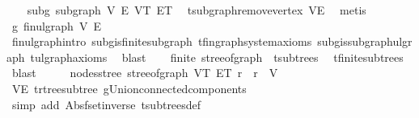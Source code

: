 \begin{isabellebody}
\ \ \isamarkupfalse%
\ subg{\isacharcolon}{\kern0pt}\ subgraph\ V{\isacharprime}{\kern0pt}\ E{\isacharprime}{\kern0pt}\ V\isactrlsub T\ E\isactrlsub T\ \isamarkupfalse%
\ t{\isachardot}{\kern0pt}subgraph{\isacharunderscore}{\kern0pt}remove{\isacharunderscore}{\kern0pt}vertex\ VE{\isacharprime}{\kern0pt}\ \isamarkupfalse%
\ metis\isanewline
\ \ \isamarkupfalse%
\ g{\isacharprime}{\kern0pt}{\isacharcolon}{\kern0pt}\ fin{\isacharunderscore}{\kern0pt}ulgraph\ V{\isacharprime}{\kern0pt}\ E{\isacharprime}{\kern0pt}\ \isamarkupfalse%
\ fin{\isacharunderscore}{\kern0pt}ulgraph{\isachardot}{\kern0pt}intro\ subg{\isachardot}{\kern0pt}is{\isacharunderscore}{\kern0pt}finite{\isacharunderscore}{\kern0pt}subgraph\ t{\isachardot}{\kern0pt}fin{\isacharunderscore}{\kern0pt}graph{\isacharunderscore}{\kern0pt}system{\isacharunderscore}{\kern0pt}axioms\ subg{\isachardot}{\kern0pt}is{\isacharunderscore}{\kern0pt}subgraph{\isacharunderscore}{\kern0pt}ulgraph\ t{\isachardot}{\kern0pt}ulgraph{\isacharunderscore}{\kern0pt}axioms\ \isamarkupfalse%
\ blast\isanewline
\isanewline
\ \ \isamarkupfalse%
\ {\isachardoublequoteopen}finite\ {\isacharparenleft}{\kern0pt}stree{\isacharunderscore}{\kern0pt}of{\isacharunderscore}{\kern0pt}graph\ {\isacharbackquote}{\kern0pt}\ t{\isachardot}{\kern0pt}subtrees{\isacharparenright}{\kern0pt}{\isachardoublequoteclose}\ \isamarkupfalse%
\ t{\isachardot}{\kern0pt}finite{\isacharunderscore}{\kern0pt}subtrees\ \isamarkupfalse%
\ blast\isanewline
\ \ \isamarkupfalse%
\ \isamarkupfalse%
\ {\isachardoublequoteopen}nodes{\isacharunderscore}{\kern0pt}stree\ {\isacharparenleft}{\kern0pt}stree{\isacharunderscore}{\kern0pt}of{\isacharunderscore}{\kern0pt}graph\ {\isacharparenleft}{\kern0pt}V\isactrlsub T{\isacharcomma}{\kern0pt}\ E\isactrlsub T{\isacharcomma}{\kern0pt}\ r{\isacharparenright}{\kern0pt}{\isacharparenright}{\kern0pt}\ {\isacharequal}{\kern0pt}\ {\isacharbraceleft}{\kern0pt}r{\isacharbraceright}{\kern0pt}\ {\isasymunion}\ V{\isacharprime}{\kern0pt}{\isachardoublequoteclose}\isanewline
\ \ \ \ \isamarkupfalse%
\ {}\ \isamarkupfalse%
\ VE{\isacharprime}{\kern0pt}\ t{\isachardot}{\kern0pt}rtree{\isacharunderscore}{\kern0pt}subtree\ g{\isacharprime}{\kern0pt}{\isachardot}{\kern0pt}Union{\isacharunderscore}{\kern0pt}connected{\isacharunderscore}{\kern0pt}components\ \isamarkupfalse%
\ {\isacharparenleft}{\kern0pt}simp\ add{\isacharcolon}{\kern0pt}\ Abs{\isacharunderscore}{\kern0pt}fset{\isacharunderscore}{\kern0pt}inverse\ t{\isachardot}{\kern0pt}subtrees{\isacharunderscore}{\kern0pt}def{\isacharparenright}{\kern0pt}\isanewline

\end{isabellebody}
